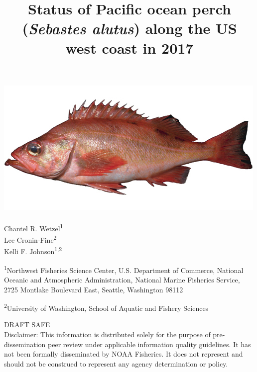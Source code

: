 \documentclass[12pt,]{article}
\title{Status of Pacific ocean perch (\emph{Sebastes alutus}) along the US west
coast in 2017}
\author{}
\date{}
\begin{document}
\maketitle


\begin{center}
\thispagestyle{empty}


\vspace{.5cm}

\includegraphics{Sebastes_alutus}~\\[0.5cm]



Chantel R. Wetzel\textsuperscript{1}\\
Lee Cronin-Fine\textsuperscript{2}\\
Kelli F. Johnson\textsuperscript{1,2}\\

\vspace{.5cm}

\small
\textsuperscript{1}Northwest Fisheries Science Center, U.S. Department of Commerce, National Oceanic and Atmospheric Administration, National Marine Fisheries Service, 2725 Montlake Boulevard East, Seattle, Washington 98112\\

\vspace{.3cm}

\textsuperscript{2}University of Washington, School of Aquatic and Fishery Sciences\\





\vspace{1cm}

\vfill
DRAFT SAFE\\
Disclaimer: This information is distributed solely for the purpose of pre-dissemination
peer review under applicable information quality guidelines. It has not been formally
disseminated by NOAA Fisheries. It does not represent and should not be construed to
represent any agency determination or policy. 




\end{center}
\end{document}
